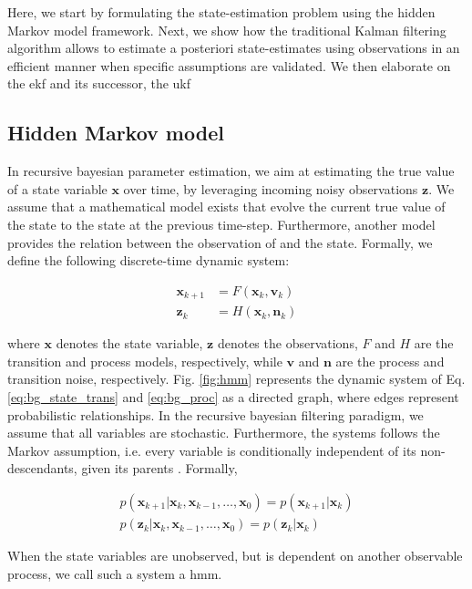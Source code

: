 Here, we start by formulating the state-estimation problem using the hidden Markov model framework.
Next, we show how the traditional Kalman filtering algorithm \cite{kalman1960} allows to estimate a posteriori state-estimates using observations in an efficient manner when specific assumptions are validated.
We then elaborate on the \gls{ekf} and its successor, the \gls{ukf}

\subsection{Hidden Markov model}
In recursive bayesian parameter estimation, we aim at estimating the true value of a state variable $\bm{x}$ over time, by leveraging incoming noisy observations $\bm{z}$.
We assume that a mathematical model exists that evolve the current true value of the state to the state at the previous time-step.
Furthermore, another model provides the relation between the observation of and the state.
Formally, we define the following discrete-time dynamic system:

\begin{align}
  \bm{x}_{k+1}&=F(\bm{x}_{k},\bm{v}_{k}) \label{eq:bg_state_trans}\\
  \bm{z}_{k}&= H(\bm{x}_{k}, \bm{n}_{k}) \label{eq:bg_proc}
\end{align}

where $\bm{x}$ denotes the state variable, $\bm{z}$ denotes the observations,
$F$ and $H$ are the transition and process models, respectively, while $\bm{v}$ and $\bm{n}$ are the process and transition noise, respectively.
Fig. \ref{fig:hmm} represents the dynamic system of Eq. \ref{eq:bg_state_trans} and \ref{eq:bg_proc} as a directed graph, where edges represent probabilistic relationships.
In the recursive bayesian filtering paradigm, we assume that all variables are stochastic.
Furthermore, the systems follows the Markov assumption, i.e. every variable is conditionally independent of its non-descendants, given its parents \cite{geiger90}.
Formally,

\begin{align}
  p(\bm{x}_{k+1}|\bm{x}_{k}, \bm{x}_{k-1},\ldots,\bm{x}_{0})=p(\bm{x}_{k+1}|\bm{x}_{k})\\
  p(\bm{z}_{k}|\bm{x}_{k}, \bm{x}_{k-1},\ldots,\bm{x}_{0})=p(\bm{z}_{k}|\bm{x}_{k})
\end{align}

When the state variables are unobserved, but is dependent on another observable process, we call such a system a \gls{hmm}.


